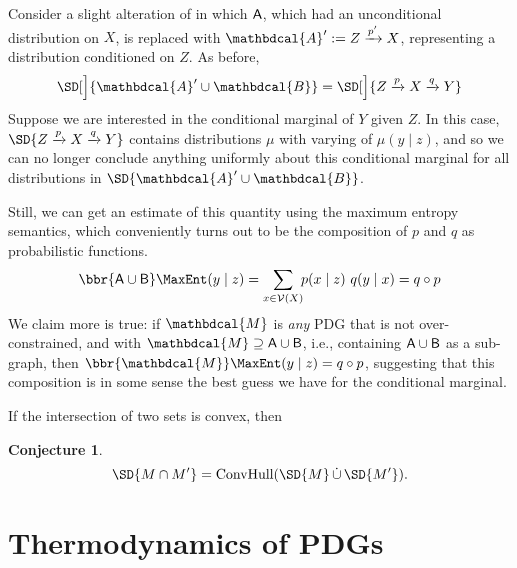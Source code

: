 \documentclass{article}
\theoremstyle{plain}
\newtheorem{conj}[theorem]{Conjecture}
\theoremstyle{definition}
\theoremstyle{remark}
\newcommand{\V}{\mathcal V}
\newcommand{\dg}[1]{\mathbdcal{#1}}
\numberwithin{equation}{section}
\begin{document}
\begin{vfull}
\begin{example}[composition]
	Consider a slight alteration of  in which $\sf A$, which had an unconditional distribution on $X$, is replaced with $\dg A' := Z \xrightarrow{p'} X$, representing a distribution conditioned on $Z$. 
	As before,
	\[ \SD[\Big]{{\dg A' \cup \dg B}} = \SD[\Big]{{Z} \xrightarrow{p} X \xrightarrow{q} Y} \]
	Suppose we are interested in the conditional marginal of $Y$ given $Z$. In this case, $\SD{{Z} \xrightarrow{p} X \xrightarrow{q} Y} $ contains distributions $\mu$ with varying of $\mu(y \mid z)$, and so we can no longer conclude anything uniformly about this conditional marginal for all distributions in $\SD{{\dg A' \cup \dg B}}$. 
	
	Still, we can get an estimate of this quantity using the maximum entropy semantics, which conveniently turns out to be the composition of $p$ and $q$ as probabilistic functions.
	$$ \bbr{{\sf A \cup B}}\MaxEnt(y \mid z) = \sum_{x \in \V(X)}\!\! p (x \mid z)\ q(y \mid x) = q \circ p $$
	We claim more is true: if $\dg M$ is \emph{any} PDG that is not over-constrained, and with $\dg M \supseteq \sf A \cup B$, i.e., containing $\sf A \cup B$ as a sub-graph, then
	$ \bbr{\dg M}\MaxEnt(y \mid z) = q \circ p$,
	suggesting that this composition is in some sense the best guess we have for the conditional marginal. 
\end{example}

\begin{vleftovers}
If the intersection of two sets is convex, then 
\begin{conj}\label{prop:intersect-set-semantics}
	\[ \SD{M \cap M'} = \text{ConvHull}(\SD{M} \mathop{\dot\cup} \SD{M'}).\]
\end{conj}
\end{vleftovers}
\end{vfull}

\section{Thermodynamics of PDGs}\label{sec:thermo}
\end{document}
